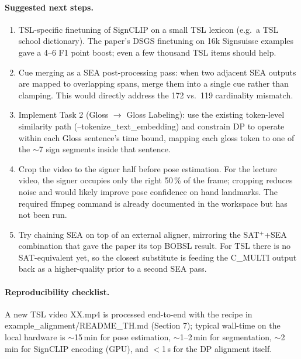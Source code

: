 \documentclass[11pt,a4paper]{article}
\def\texttt#1{#1}%
\def\textbf#1{#1}%
\begin{document}
\paragraph{Suggested next steps.}
\begin{enumerate}[leftmargin=1.5em]
  \item \textbf{TSL-specific finetuning of SignCLIP} on a small TSL lexicon
        (e.g.\ a TSL school dictionary). The paper's DSGS finetuning on 16k
        Signsuisse examples gave a 4--6 F1 point boost; even a few thousand
        TSL items should help.
  \item \textbf{Cue merging} as a SEA post-processing pass: when two
        adjacent SEA outputs are mapped to overlapping spans, merge them
        into a single cue rather than clamping. This would directly address
        the 172 vs.\ 119 cardinality mismatch.
  \item \textbf{Implement Task 2} (Gloss $\to$ Gloss Labeling): use the
        existing token-level similarity path
        (\texttt{--tokenize\_text\_embedding}) and constrain DP to operate
        within each Gloss sentence's time bound, mapping each gloss token
        to one of the $\sim$7 sign segments inside that sentence.
  \item \textbf{Crop the video} to the signer half before pose estimation.
        For the lecture video, the signer occupies only the right 50\,\%
        of the frame; cropping reduces noise and would likely improve pose
        confidence on hand landmarks. The required \texttt{ffmpeg} command
        is already documented in the workspace but has not been run.
  \item \textbf{Try chaining SEA on top of an external aligner}, mirroring
        the SAT$^{+}$+SEA combination that gave the paper its top BOBSL
        result. For TSL there is no SAT-equivalent yet, so the closest
        substitute is feeding the \texttt{C\_MULTI} output back as a
        higher-quality prior to a second SEA pass.
\end{enumerate}

\paragraph{Reproducibility checklist.} A new TSL video \texttt{XX.mp4} is
processed end-to-end with the recipe in
\texttt{example\_alignment/README\_TH.md} (Section 7); typical wall-time on
the local hardware is $\sim$15\,min for pose estimation, $\sim$1--2\,min for
segmentation, $\sim$2\,min for SignCLIP encoding (GPU), and $<$1\,s for the
DP alignment itself.
\end{document}
